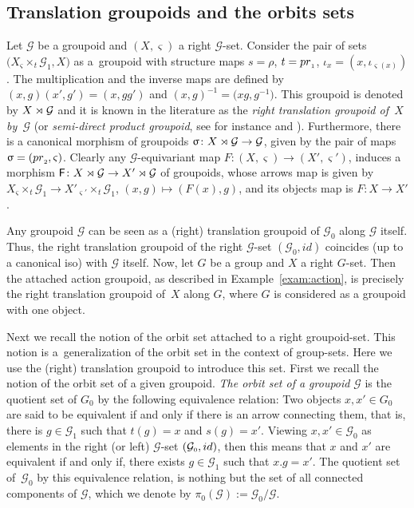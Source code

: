 \documentclass[11pt]{article}
\numberwithin{equation}{section}
\newcommand{\Sf}[1]{\mathsf{#1}}
\newcommand{\Go}{\cG_{\Sscript{0}}}
\newcommand{\Ga}{\cG_{\Sscript{1}}}
\newcommand{\cG}{{\mathcal G}}
\newcommand{\Sscript}[1]{\scriptscriptstyle{#1}}
\newcommand{\due}[3]{{}_{{#2 }} {#1}_{{ #3}} }
\begin{document}
\begin{Example}
\end{Example}

\subsection{Translation groupoids and the orbits sets}\label{ssec:Grpd12}
 Let $\cG$ be a groupoid and $(X,\varsigma)$ a right $\cG$-set. Consider the pair of sets $\big( X \due \times {\Sscript{\varsigma}} { \Sscript{{t}}} \Ga, X \big)$ as a~groupoid with structure maps ${s}=\rho$, $t={\rm pr}_{\Sscript{1}}$, $\iota_{\Sscript{x}}=(x,\iota_{\varsigma(x)})$. The multiplication and the inverse maps are defined by $(x,g)(x',g')=(x,gg')$ and $(x,g)^{-1}=\big(xg,g^{-1}\big)$. This groupoid is denoted by $X \rJoin \cG$ and it is known in the literature as the \emph{right translation groupoid of~$X$ by~$\cG$} (or \emph{semi-direct product groupoid}, see for instance \cite[p.~163]{Moedijk/Mrcun:2005} and \cite{Kaoutit/Kowalzig:14}). Furthermore, there is a canonical morphism of groupoids $\upsigma\colon X\rJoin \cG \to \cG$, given by the pair of maps $\upsigma=({\rm pr}_{\Sscript{2}}, \varsigma)$. Clearly any $\cG$-equivariant map $F\colon (X,\varsigma) \to (X',\varsigma')$, induces a morphism $\Sf{F}\colon X \rJoin \cG \to X' \rJoin \cG$ of groupoids, whose arrows map is given by $X \due \times {\Sscript{\varsigma}} { \Sscript{{t}}} \Ga \to X' \due \times {\Sscript{\varsigma'}} { \Sscript{{t}}} \Ga $, $(x, g) \mapsto (F(x), g)$, and its objects map is $F\colon X \to X'$.

\begin{Example}\label{exam:refereePacience}Any groupoid $\cG$ can be seen as a (right) translation groupoid of $\Go$ along $\cG$ itself. Thus, the right translation groupoid of the right $\cG$-set $(\Go, id)$ coincides (up to a canonical iso) with $\cG$ itself. Now, let $G$ be a group and $X$ a right $G$-set. Then the attached action groupoid, as described in Example~\ref{exam:action}, is precisely the right translation groupoid of~$X$ along $G$, where $G$ is considered as a groupoid with one object.
\end{Example}

Next we recall the notion of the orbit set attached to a right groupoid-set. This notion is a~generalization of the orbit set in the context of group-sets. Here we use the (right) translation groupoid to introduce this set.
First we recall the notion of the orbit set of a given groupoid. \emph{The orbit set of a groupoid} $\cG$ is the quotient set of $G_{\Sscript{0}}$ by the following equivalence relation: Two objects $x, x' \in G_{\Sscript{0}}$ are said to be equivalent if and only if there is an arrow connecting them, that is, there is $g \in\Ga$ such that $t(g)=x$ and $s(g)=x'$. Viewing $x, x' \in \Go$ as elements in the right (or left) $\cG$-set $(\Go, {\rm id})$, then this means that $x$ and $x'$ are equivalent if and only if, there exists $g \in \Ga$ such that $x . g=x'$. The quotient set of~$\Go$ by this equivalence relation, is nothing but the set of all connected components of $\cG$, which we denote by $\pi_{\Sscript{0}}(\cG):=\Go/\cG$.
\end{document}
